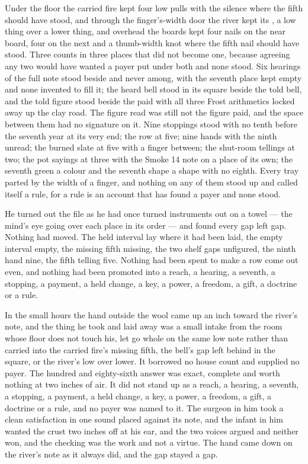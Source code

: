 Under the floor the carried fire kept four low pulls with the silence where the fifth should have stood, and through the finger's-width door the river kept its , a low thing over a lower thing, and overhead the boards kept four nails on the near board, four on the next and a thumb-width knot where the fifth nail should have stood. Three counts in three places that did not become one, because agreeing any two would have wanted a payer put under both and none stood. Six hearings of the full note stood beside and never among, with the seventh place kept empty and none invented to fill it; the heard bell stood in its square beside the told bell, and the told figure stood beside the paid with all three Frost arithmetics locked away up the clay road. The figure read was still not the figure paid, and the space between them had no signature on it. Nine stoppings stood with no tenth before the seventh year at its very end; the row at five; nine hands with the ninth unread; the burned slate at five with a finger between; the shut-room tellings at two; the pot sayings at three with the Smoke 14 note on a place of its own; the seventh green a colour and the seventh shape a shape with no eighth. Every tray parted by the width of a finger, and nothing on any of them stood up and called itself a rule, for a rule is an account that has found a payer and none stood.

He turned out the file as he had once turned instruments out on a towel --- the mind's eye going over each place in its order --- and found every gap left gap. Nothing had moved. The held interval lay where it had been laid, the empty interval empty, the missing fifth missing, the two shelf gaps unfigured, the ninth hand nine, the fifth telling five. Nothing had been spent to make a row come out even, and nothing had been promoted into a reach, a hearing, a seventh, a stopping, a payment, a held change, a key, a power, a freedom, a gift, a doctrine or a rule.

In the small hours the hand outside the wool came up an inch toward the river's note, and the thing he took and laid away was a small intake from the room whose floor does not touch his, let go whole on the same low note rather than carried into the carried fire's missing fifth, the bell's gap left behind in the square, or the river's low over lower. It borrowed no house count and supplied no payer. The hundred and eighty-sixth answer was exact, complete and worth nothing at two inches of air. It did not stand up as a reach, a hearing, a seventh, a stopping, a payment, a held change, a key, a power, a freedom, a gift, a doctrine or a rule, and no payer was named to it. The surgeon in him took a clean satisfaction in one sound placed against its note, and the infant in him wanted the crust two inches off at his ear, and the two voices argued and neither won, and the checking was the work and not a virtue. The hand came down on the river's note as it always did, and the gap stayed a gap.

